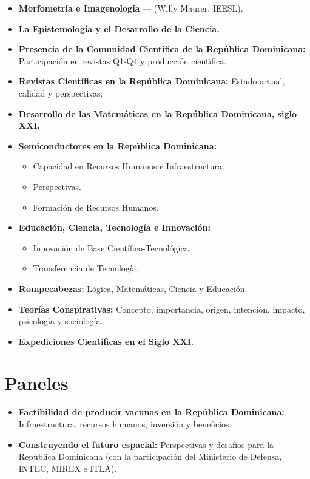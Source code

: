 \documentclass[11pt,a4paper]{article}
\begin{document}
\begin{itemize}[leftmargin=*, label={--}]
    \item \textbf{Morfometría e Imagenología} --- (Willy Maurer, IEESL).
    \item \textbf{La Epistemología y el Desarrollo de la Ciencia.}
    \item \textbf{Presencia de la Comunidad Científica de la República Dominicana:} Participación en revistas Q1-Q4 y producción científica.
    \item \textbf{Revistas Científicas en la República Dominicana:} Estado actual, calidad y perspectivas.
    \item \textbf{Desarrollo de las Matemáticas en la República Dominicana, siglo XXI.}
    \item \textbf{Semiconductores en la República Dominicana:}
    \begin{itemize}[leftmargin=1.5em, label={--}]
        \item Capacidad en Recursos Humanos e Infraestructura.
        \item Perspectivas.
        \item Formación de Recursos Humanos.
    \end{itemize}
    \item \textbf{Educación, Ciencia, Tecnología e Innovación:}
    \begin{itemize}[leftmargin=1.5em, label={--}]
        \item Innovación de Base Científico-Tecnológica.
        \item Transferencia de Tecnología.
    \end{itemize}
    \item \textbf{Rompecabezas:} Lógica, Matemáticas, Ciencia y Educación.
    \item \textbf{Teorías Conspirativas:} Concepto, importancia, origen, intención, impacto, psicología y sociología.
    \item \textbf{Expediciones Científicas en el Siglo XXI.}
\end{itemize}

\section{Paneles}
\begin{itemize}[leftmargin=*, label={--}]
    \item \textbf{Factibilidad de producir vacunas en la República Dominicana:} Infraestructura, recursos humanos, inversión y beneficios.
    \item \textbf{Construyendo el futuro espacial:} Perspectivas y desafíos para la República Dominicana (con la participación del Ministerio de Defensa, INTEC, MIREX e ITLA).
\end{itemize}
\end{document}

